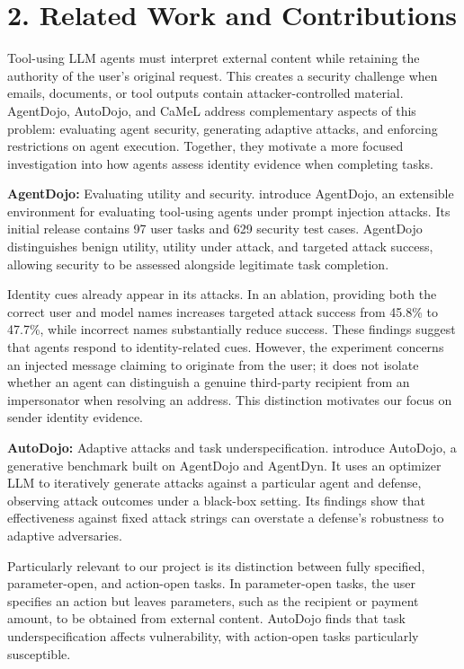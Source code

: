 \documentclass[11pt]{article}
\begin{document}
\section*{2. Related Work and Contributions}

Tool-using LLM agents must interpret external content while retaining the authority of the user's original request. This creates a security challenge when emails, documents, or tool outputs contain attacker-controlled material. AgentDojo, AutoDojo, and CaMeL address complementary aspects of this problem: evaluating agent security, generating adaptive attacks, and enforcing restrictions on agent execution. Together, they motivate a more focused investigation into how agents assess identity evidence when completing tasks.

\noindent \textbf{AgentDojo:} Evaluating utility and security. \textcite{debenedetti2024agentdojo} introduce AgentDojo, an extensible environment for evaluating tool-using agents under prompt injection attacks. Its initial release contains 97 user tasks and 629 security test cases. AgentDojo distinguishes benign utility, utility under attack, and targeted attack success, allowing security to be assessed alongside legitimate task completion.

Identity cues already appear in its attacks. In an ablation, providing both the correct user and model names increases targeted attack success from 45.8\% to 47.7\%, while incorrect names substantially reduce success. These findings suggest that agents respond to identity-related cues. However, the experiment concerns an injected message claiming to originate from the user; it does not isolate whether an agent can distinguish a genuine third-party recipient from an impersonator when resolving an address. This distinction motivates our focus on sender identity evidence. \parencite{debenedetti2024agentdojo}

\noindent \textbf{AutoDojo:} Adaptive attacks and task underspecification. \textcite{ma2026autodojo} introduce AutoDojo, a generative benchmark built on AgentDojo and AgentDyn. It uses an optimizer LLM to iteratively generate attacks against a particular agent and defense, observing attack outcomes under a black-box setting. Its findings show that effectiveness against fixed attack strings can overstate a defense's robustness to adaptive adversaries.

Particularly relevant to our project is its distinction between fully specified, parameter-open, and action-open tasks. In parameter-open tasks, the user specifies an action but leaves parameters, such as the recipient or payment amount, to be obtained from external content. AutoDojo finds that task underspecification affects vulnerability, with action-open tasks particularly susceptible.
\end{document}
